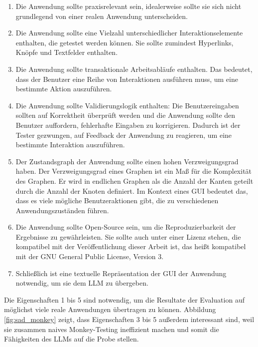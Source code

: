\begin{enumerate}
    \item
        Die Anwendung sollte praxisrelevant sein, idealerweise sollte sie sich nicht grundlegend von einer realen Anwendung unterscheiden.
    \item
        Die Anwendung sollte eine Vielzahl unterschiedlicher Interaktionselemente ent\-hal\-ten, die getestet werden können. 
        Sie sollte zumindest Hyperlinks, Knöpfe und Textfelder enthalten.
    \item
        Die Anwendung sollte transaktionale Arbeitsabläufe enthalten.
        Das bedeutet, dass der Benutzer eine Reihe von Interaktionen ausführen muss, um eine bestimmte Aktion auszuführen.
    \item
        Die Anwendung sollte Validierungslogik enthalten: Die Benutzereingaben sollten auf Korrektheit überprüft werden und die Anwendung sollte den Benutzer auffordern, fehlerhafte Eingaben zu korrigieren.
        Dadurch ist der Tester gezwungen, auf Feedback der Anwendung zu reagieren, um eine bestimmte Interaktion auszuführen.
    \item
        Der Zustandsgraph der Anwendung sollte einen hohen Verzweigungsgrad haben.
        Der Verzweigungsgrad eines Graphen ist ein Maß für die Komplexität des Graphen.
        Er wird in endlichen Graphen als die Anzahl der Kanten geteilt durch die Anzahl der Knoten definiert.
        Im Kontext eines GUI bedeutet das, dass es viele mögliche Benutzeraktionen gibt, die zu verschiedenen Anwendungszuständen führen.
    \item 
        Die Anwendung sollte Open-Source sein, um die Reproduzierbarkeit der Ergebnisse zu gewährleisten.
        Sie sollte auch unter einer Lizenz stehen, die kompatibel mit der Veröffentlichung dieser Arbeit ist, das heißt kompatibel mit der GNU General Public License, Version 3.
    \item Schließlich ist eine textuelle Repräsentation der GUI der Anwendung notwendig, um sie dem LLM zu übergeben.
\end{enumerate}

Die Eigenschaften 1 bis 5 sind notwendig, um die Resultate der Evaluation auf möglichst viele reale Anwendungen übertragen zu können.
Abbildung \ref{fig:sad_monkey} zeigt, dass Eigenschaften 3 bis 5 außerdem interessant sind, weil sie zusammen naives Monkey-Testing ineffizient machen und somit die Fähigkeiten des LLMs auf die Probe stellen.

